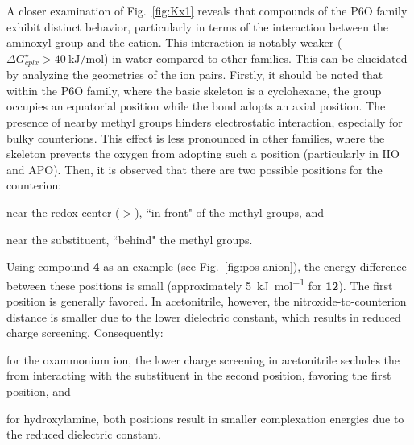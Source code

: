 \documentclass[review]{elsarticle}
\begin{document}
A closer examination of Fig.~\ref{fig:Kx1} reveals that compounds of the P6O family exhibit distinct behavior, particularly in terms of the interaction between the aminoxyl group and the cation. This interaction is notably weaker ($\Delta G^\star_{cplx} > \SI{40}{\kilo\joule\per\mole}$) in water compared to other families. This can be elucidated by analyzing the geometries of the ion pairs. 
Firstly, it should be noted that within the P6O family, where the basic skeleton is a cyclohexane, the  group occupies an equatorial position while the  bond adopts an axial position. The presence of nearby methyl groups hinders electrostatic interaction, especially for bulky counterions. This effect is less pronounced in other families, where the skeleton prevents the oxygen from adopting such a position (particularly in IIO and APO).
Then,  it is observed that there are two possible positions for the counterion: 
\begin{inparaenum}[(i)]
	\item near the redox center ($>$), ``in front" of the methyl groups, and 
	\item near the substituent, ``behind" the methyl groups.
\end{inparaenum}
Using compound \textbf{4} as an example (see Fig.~\ref{fig:pos-anion}), the energy difference between these positions is small (approximately \SI{5}{\kilo\joule\per\mole} for \textbf{12}). The first position is generally favored. In acetonitrile, however, the nitroxide-to-counterion distance is smaller due to the lower dielectric constant, which results in reduced charge screening. Consequently:
\begin{inparaenum}[(i)]
	\item for the oxammonium ion, the lower charge screening in acetonitrile secludes the  from interacting with the substituent in the second position, favoring the first position, and
	\item for hydroxylamine, both positions result in smaller complexation energies due to the reduced dielectric constant.
\end{inparaenum}
\end{document}
